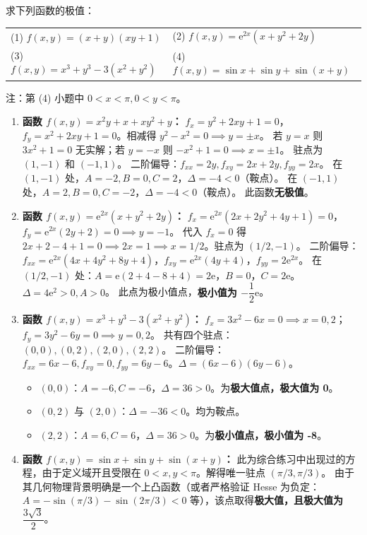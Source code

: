 \documentclass[lang=cn,11pt]{elegantbook}
\begin{document}
\begin{exercise}[各类函数的极值判定]
求下列函数的极值：\\
\begin{tabular}{p{} p{}}
(1) $f(x,y)=(x+y)(xy+1)$ & (2) $f(x,y)=\mathrm{e}^{2x}(x+y^2+2y)$ \\
(3) $f(x,y)=x^3+y^3-3(x^2+y^2)$ & (4) $f(x,y)=\sin x+\sin y+\sin(x+y)$ \\
\end{tabular}
注：第 (4) 小题中 $0<x<\pi,0<y<\pi$。
\end{exercise}
\begin{solution}
\begin{enumerate}
  \item[(1)] \textbf{函数 $f(x,y)=x^2y+x+xy^2+y$：}
  $f_x = y^2+2xy+1=0$，$f_y = x^2+2xy+1=0$。相减得 $y^2-x^2=0 \implies y=\pm x$。
  若 $y=x$ 则 $3x^2+1=0$ 无实解；若 $y=-x$ 则 $-x^2+1=0 \implies x=\pm 1$。
  驻点为 $(1,-1)$ 和 $(-1,1)$。
  二阶偏导：$f_{xx}=2y, f_{xy}=2x+2y, f_{yy}=2x$。
  在 $(1,-1)$ 处，$A=-2, B=0, C=2$，$\Delta=-4 < 0$（鞍点）。
  在 $(-1,1)$ 处，$A=2, B=0, C=-2$，$\Delta=-4 < 0$（鞍点）。
  此函数\textbf{无极值}。

  \item[(2)] \textbf{函数 $f(x,y)=\mathrm{e}^{2x}(x+y^2+2y)$：}
  $f_x = \mathrm{e}^{2x}(2x+2y^2+4y+1) = 0$，$f_y = \mathrm{e}^{2x}(2y+2) = 0 \implies y=-1$。
  代入 $f_x=0$ 得 $2x+2-4+1=0 \implies 2x=1 \implies x=1/2$。驻点为 $(1/2, -1)$。
  二阶偏导：$f_{xx} = \mathrm{e}^{2x}(4x+4y^2+8y+4)$，$f_{xy} = \mathrm{e}^{2x}(4y+4)$，$f_{yy} = 2\mathrm{e}^{2x}$。
  在 $(1/2, -1)$ 处：$A = \mathrm{e}(2+4-8+4) = 2\mathrm{e}$，$B = 0$，$C = 2\mathrm{e}$。$\Delta = 4\mathrm{e}^2 > 0, A > 0$。
  此点为极小值点，\textbf{极小值为 $-\dfrac{1}{2}\mathrm{e}$}。

  \item[(3)] \textbf{函数 $f(x,y)=x^3+y^3-3(x^2+y^2)$：}
  $f_x = 3x^2-6x = 0 \implies x=0, 2$；$f_y = 3y^2-6y = 0 \implies y=0, 2$。
  共有四个驻点：$(0,0), (0,2), (2,0), (2,2)$。
  二阶偏导：$f_{xx} = 6x-6, f_{xy} = 0, f_{yy} = 6y-6$。$\Delta = (6x-6)(6y-6)$。
  \begin{itemize}
    \item $(0,0)$：$A=-6, C=-6$，$\Delta = 36 > 0$。为\textbf{极大值点，极大值为 0}。
    \item $(0,2)$ 与 $(2,0)$：$\Delta = -36 < 0$。均为鞍点。
    \item $(2,2)$：$A=6, C=6$，$\Delta = 36 > 0$。为\textbf{极小值点，极小值为 -8}。
  \end{itemize}

  \item[(4)] \textbf{函数 $f(x,y)=\sin x+\sin y+\sin(x+y)$：}
  此为综合练习中出现过的方程，由于定义域开且受限在 $0<x,y<\pi$。解得唯一驻点 $(\pi/3, \pi/3)$。
  由于其几何物理背景明确是一个上凸函数（或者严格验证 Hesse 为负定：$A = -\sin(\pi/3)-\sin(2\pi/3) < 0$ 等），该点取得\textbf{极大值，且极大值为 $\dfrac{3\sqrt{3}}{2}$}。
\end{enumerate}
\end{solution}
\end{document}
